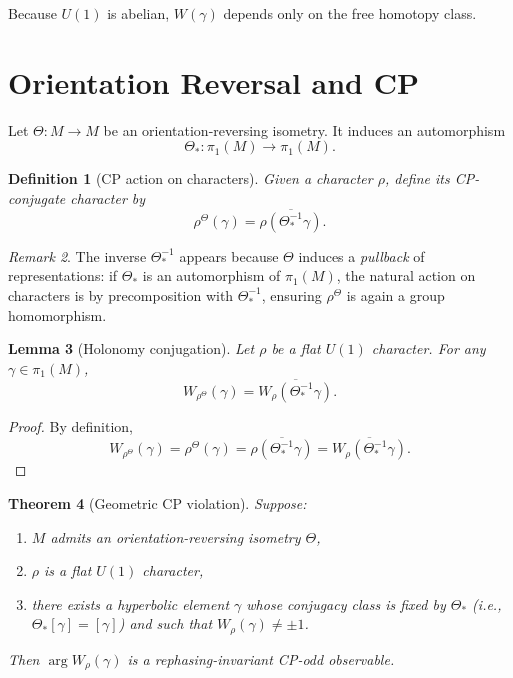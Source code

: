 \documentclass[12pt]{article}
\newtheorem{theorem}{Theorem}
\newtheorem{lemma}[theorem]{Lemma}
\newtheorem{definition}[theorem]{Definition}
\theoremstyle{remark}
\newtheorem{remark}[theorem]{Remark}
\theoremstyle{plain}
\begin{document}
Because $U(1)$ is abelian, $W(\gamma)$ depends only on the
free homotopy class.

\section{Orientation Reversal and CP}

Let $\Theta : M \to M$ be an orientation-reversing isometry.
It induces an automorphism
\[
\Theta_* : \pi_1(M) \to \pi_1(M).
\]

\begin{definition}[CP action on characters]
Given a character $\rho$, define its CP-conjugate character by
\[
\rho^{\Theta}(\gamma)
=
\overline{\rho(\Theta_*^{-1}\gamma)}.
\]
\end{definition}

\begin{remark}
The inverse $\Theta_*^{-1}$ appears because $\Theta$ induces a
\emph{pullback} of representations: if $\Theta_*$ is an automorphism
of $\pi_1(M)$, the natural action on characters is by precomposition
with $\Theta_*^{-1}$, ensuring $\rho^\Theta$ is again a group homomorphism.
\end{remark}

\begin{lemma}[Holonomy conjugation]
Let $\rho$ be a flat $U(1)$ character.
For any $\gamma \in \pi_1(M)$,
\[
W_{\rho^{\Theta}}(\gamma)
=
\overline{W_{\rho}(\Theta_*^{-1}\gamma)}.
\]
\end{lemma}

\begin{proof}
By definition,
\[
W_{\rho^{\Theta}}(\gamma)
=
\rho^{\Theta}(\gamma)
=
\overline{\rho(\Theta_*^{-1}\gamma)}
=
\overline{W_{\rho}(\Theta_*^{-1}\gamma)}.
\]
\end{proof}

\begin{theorem}[Geometric CP violation]
Suppose:
\begin{enumerate}
\item $M$ admits an orientation-reversing isometry $\Theta$,
\item $\rho$ is a flat $U(1)$ character,
\item there exists a hyperbolic element $\gamma$ whose conjugacy class
is fixed by $\Theta_*$ (i.e., $\Theta_*[\gamma] = [\gamma]$) and such that
$W_\rho(\gamma) \neq \pm 1$.
\end{enumerate}
Then $\arg W_\rho(\gamma)$ is a rephasing-invariant
CP-odd observable.
\end{theorem}
\end{document}

